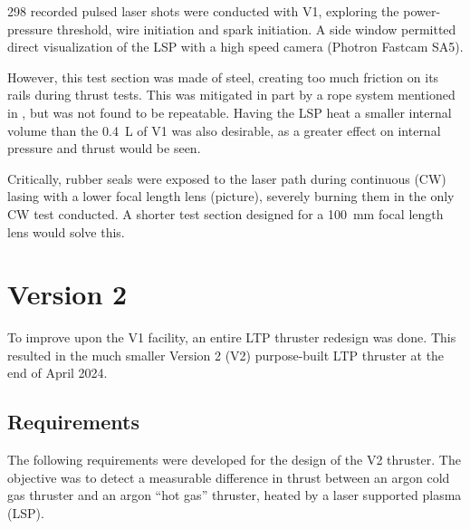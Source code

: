         298 recorded pulsed laser shots were conducted with V1, exploring the power-pressure threshold, wire initiation and spark initiation. A side window permitted direct visualization of the LSP with a high speed camera (Photron Fastcam SA5).


        However, this test section was made of steel, creating too much friction on its rails during thrust tests. This was mitigated in part by a rope system mentioned in \textcite{duplayArgonLaserPlasmaThruster2024a}, but was not found to be repeatable. Having the LSP heat a smaller internal volume than the \qty{0.4}{L} of V1 was also desirable, as a greater effect on internal pressure and thrust would be seen.

        Critically, rubber seals were exposed to the laser path during continuous (CW) lasing with a lower focal length lens (picture), severely burning them in the only CW test conducted. A shorter test section designed for a \qty{100}{mm} focal length lens would solve this.

    \section{Version 2} \label{sec:design_v2}

        To improve upon the V1 facility, an entire LTP thruster redesign was done. This resulted in the much smaller Version 2 (V2) purpose-built LTP thruster at the end of April 2024.

        \subsection{Requirements}

            The following requirements were developed for the design of the V2 thruster. The objective was to detect a measurable difference in thrust between an argon cold gas thruster and an argon “hot gas” thruster, heated by a laser supported plasma (LSP).

